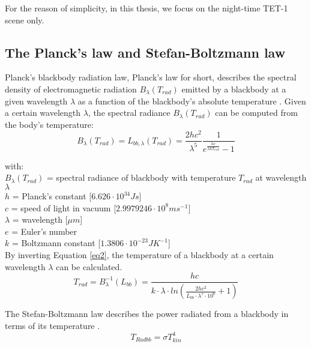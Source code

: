\noindent For the reason of simplicity, in this thesis, we focus on the night-time TET-1 scene only. \\


\subsection{The Planck's law and Stefan-Boltzmann law}
Planck's blackbody radiation law, Planck's law for short, describes the spectral density of electromagnetic radiation $B_{\lambda}(T_{rad})$ emitted by a blackbody at a given wavelength $\lambda$ as a function of the blackbody's absolute temperature \parencite{Reference208}. Given a certain wavelength $\lambda$, the spectral radiance $B_{\lambda}(T_{rad})$ can be computed from the body's temperature:\\
\begin{equation}
\label{eq2}
B_{\lambda}(T_{rad}) = L_{bb, \lambda}(T_{rad}) = \frac{2hc^2}{\lambda ^5} \frac{1}{e^{\frac{hc}{\lambda k T_{rad}}} - 1}
\end{equation}

\noindent with:\\
\indent $B_{\lambda}(T_{rad})$ = spectral radiance of blackbody with temperature $T_{rad}$ at wavelength $\lambda$\\
\indent $h$ = Planck's constant [$6.626 \cdot 10^{34} J s$]\\
\indent $c$ = speed of light in vacuum [$2.9979246 \cdot 10^8 m s^{-1}$]\\
\indent $\lambda$ = wavelength [$\mu m$]\\
\indent $e$ = Euler's number\\
\indent $k$ = Boltzmann constant [$1.3806 \cdot 10^{-23} J K^{-1}$]\\

\noindent By inverting Equation \eqref{eq2}, the temperature of a blackbody at a certain wavelength $\lambda$ can be calculated.\\
\begin{equation}
\label{eq3}
T_{rad} = B_{\lambda}^{-1}(L_{bb}) = \frac{hc}{k \cdot \lambda \cdot ln(\frac{2hc^2}{L_{bb} \cdot \lambda ^5 \cdot 10^6} + 1)}
\end{equation}

\noindent The Stefan-Boltzmann law describes the power radiated from a blackbody in terms of its temperature \parencite{Reference201, Reference209}.\\
\begin{equation}
\label{eq4}
T_{Radbb} = \sigma T_{kin}^4
\end{equation}

